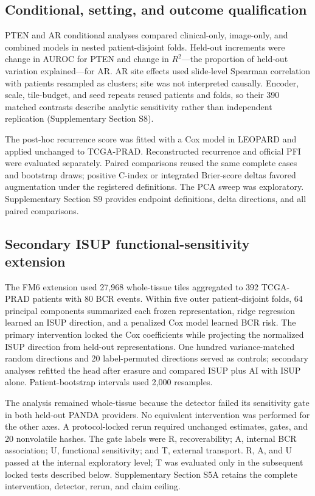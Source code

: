 \subsection{Conditional, setting, and outcome qualification}

PTEN and AR conditional analyses compared clinical-only, image-only, and combined models in
nested patient-disjoint folds. Held-out increments were change in AUROC for PTEN and change
in $R^2$---the proportion of held-out variation explained---for AR. AR site effects used
slide-level Spearman correlation with patients resampled as clusters; site was not interpreted
causally. Encoder, scale, tile-budget, and seed repeats reused patients and folds, so their
390 matched contrasts describe analytic sensitivity rather than independent replication
(Supplementary Section S8).

The post-hoc recurrence score was fitted with a Cox model in LEOPARD and applied unchanged
to TCGA-PRAD. Reconstructed recurrence and official PFI were evaluated separately. Paired
comparisons reused the same complete cases and bootstrap draws; positive C-index or integrated
Brier-score deltas favored augmentation under the registered definitions. The PCA sweep was
exploratory. Supplementary Section S9 provides endpoint definitions, delta directions, and all
paired comparisons.

\subsection{Secondary ISUP functional-sensitivity extension}

The FM6 extension used 27,968 whole-tissue tiles aggregated to 392 TCGA-PRAD patients with
80 BCR events. Within five outer patient-disjoint folds, 64 principal components summarized
each frozen representation, ridge regression learned an ISUP direction, and a penalized Cox
model learned BCR risk. The primary intervention locked the Cox coefficients while projecting
the normalized ISUP direction from held-out representations. One hundred variance-matched
random directions and 20 label-permuted directions served as controls; secondary analyses
refitted the head after erasure and compared ISUP plus AI with ISUP alone. Patient-bootstrap
intervals used 2,000 resamples.

The analysis remained whole-tissue because the detector failed its sensitivity gate in both
held-out PANDA providers. No equivalent intervention was performed for the other axes. A
protocol-locked rerun required unchanged estimates, gates, and 20 nonvolatile hashes. The gate
labels were R, recoverability; A, internal BCR association; U, functional sensitivity; and T,
external transport. R, A, and U passed at the internal exploratory level; T was evaluated only
in the subsequent locked tests described below. Supplementary Section S5A retains the complete
intervention, detector, rerun, and claim ceiling.

